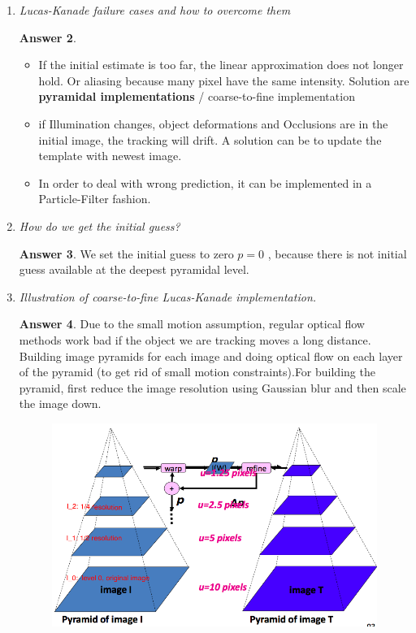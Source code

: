 \documentclass[a4paper,12 pt]{article}
\theoremstyle{definition}
\theoremstyle{remark}
\theoremstyle{definition}
\theoremstyle{definition}
\theoremstyle{definition}
\theoremstyle{definition}
\theoremstyle{remark}
\theoremstyle{remark}
\theoremstyle{definition}
\theoremstyle{definition}
\newtheorem*{answer}{Answer}
\begin{document}
\begin{enumerate}
\begin{enumerate}
\begin{answer}
\begin{figure}[h!]
\begin{center}
\caption{KLT algorithm \label{fig:klt}}
\end{center}
\end{figure}
\end{answer}
\item \textit{Lucas-Kanade failure cases and how to overcome them}
\begin{answer}
\begin{itemize}
\item If the initial estimate is too far, the linear approximation does not longer hold. Or aliasing because many pixel have the same intensity.  Solution are \textbf{pyramidal implementations} / coarse-to-fine implementation
\item if Illumination changes, object deformations and Occlusions are in the initial image, the tracking will drift.  A solution can be to update the template with newest image.
\item In order to deal with wrong prediction, it can be implemented in a Particle-Filter fashion.
\end{itemize}
\end{answer}
\item \textit{How do we get the initial guess? }
\begin{answer}
We set the initial guess to zero $p = 0$ , because there is not initial guess available at the deepest pyramidal level.
\end{answer}
\item \textit{Illustration of coarse-to-fine Lucas-Kanade implementation. }
\begin{answer}
Due to the small motion assumption, regular optical flow methods work bad if the object we are tracking moves a long distance. Building image pyramids for each image and doing optical flow on each layer of the pyramid (to get rid of small motion constraints).For building the pyramid, first reduce the image resolution using Gaussian blur and then scale the image down.
\begin{figure}[h!]
\begin{center}
\includegraphics[scale=0.3]{pics/pyramid}

\end{center}
\end{figure}
\end{answer}
\end{enumerate}
\end{enumerate}
\end{document}

